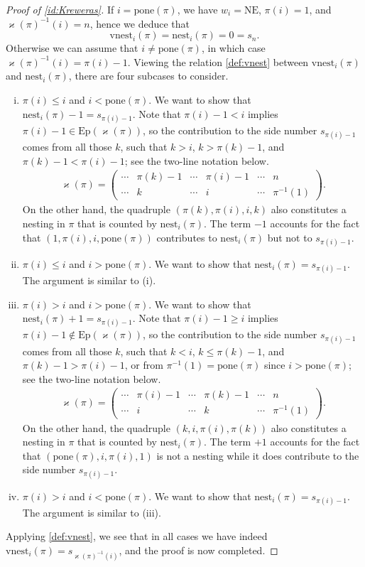 \documentclass[12pt]{amsart}
\numberwithin{equation}{section}
\theoremstyle{plain}
\theoremstyle{definition}
\def\NE{\mathrm{NE}}
\def\Excp{\mathrm{Ep}}
\def\pone{\mathrm{pone}}
\def\vnest{\mathrm{vnest}}
\def\nest{\mathrm{nest}}
\begin{document}
\begin{proof}[Proof of \eqref{id:Kreweras}]
If $i=\pone(\pi)$, we have $w_i=\NE$, $\pi(i)=1$, and $\varkappa(\pi)^{-1}(i)=n$, hence we deduce that
$$\vnest_i(\pi)=\nest_i(\pi)=0=s_n.$$
Otherwise we can assume that $i\neq\pone(\pi)$, in which case $\varkappa(\pi)^{-1}(i)=\pi(i)-1$. Viewing the relation \eqref{def:vnest} between $\vnest_i(\pi)$ and $\nest_i(\pi)$, there are four subcases to consider.
\begin{enumerate}[(i)]
    \item $\pi(i)\le i$ and $i<\pone(\pi)$. We want to show that $\nest_i(\pi)-1=s_{\pi(i)-1}$. Note that $\pi(i)-1<i$ implies $\pi(i)-1\in\Excp(\varkappa(\pi))$, so the contribution to the side number $s_{\pi(i)-1}$ comes from all those $k$, such that $k>i$, $k>\pi(k)-1$, and $\pi(k)-1<\pi(i)-1$; see the two-line notation below.
    \begin{align*}
    \varkappa(\pi)=\begin{pmatrix}
    \cdots & \pi(k)-1 & \cdots & \pi(i)-1 & \cdots & n\\
    \cdots & k & \cdots & i & \cdots & \pi^{-1}(1)
    \end{pmatrix}.
    \end{align*}
    On the other hand, the quadruple $(\pi(k),\pi(i),i,k)$ also constitutes a nesting in $\pi$ that is counted by $\nest_i(\pi)$. The term $-1$ accounts for the fact that $(1,\pi(i),i,\pone(\pi))$ contributes to $\nest_i(\pi)$ but not to $s_{\pi(i)-1}$.
    \item $\pi(i)\le i$ and $i>\pone(\pi)$. We want to show that $\nest_i(\pi)=s_{\pi(i)-1}$. The argument is similar to (i).
    \item $\pi(i)>i$ and $i>\pone(\pi)$. We want to show that $\nest_i(\pi)+1=s_{\pi(i)-1}$. Note that $\pi(i)-1\ge i$ implies $\pi(i)-1\not\in\Excp(\varkappa(\pi))$, so the contribution to the side number $s_{\pi(i)-1}$ comes from all those $k$, such that $k<i$, $k\le \pi(k)-1$, and $\pi(k)-1>\pi(i)-1$, or from $\pi^{-1}(1)=\pone(\pi)$ since $i>\pone(\pi)$; see the two-line notation below.
    \begin{align*}
    \varkappa(\pi)=\begin{pmatrix}
    \cdots & \pi(i)-1 & \cdots & \pi(k)-1 & \cdots & n\\
    \cdots & i & \cdots & k & \cdots & \pi^{-1}(1)
    \end{pmatrix}.
    \end{align*}
    On the other hand, the quadruple $(k,i,\pi(i),\pi(k))$ also constitutes a nesting in $\pi$ that is counted by $\nest_i(\pi)$. The term $+1$ accounts for the fact that $(\pone(\pi),i,\pi(i),1)$ is not a nesting while it does contribute to the side number $s_{\pi(i)-1}$.
    \item $\pi(i)>i$ and $i<\pone(\pi)$. We want to show that $\nest_i(\pi)=s_{\pi(i)-1}$. The argument is similar to (iii).
\end{enumerate}
Applying \eqref{def:vnest}, we see that in all cases we have indeed $\vnest_i(\pi)=s_{\varkappa(\pi)^{-1}(i)}$, and the proof is now completed.
\end{proof}
\end{document}
